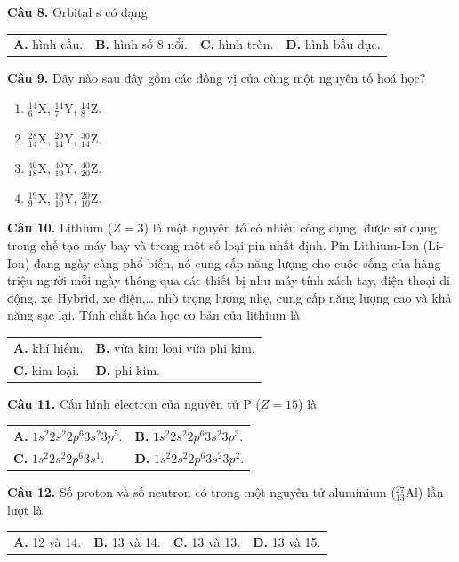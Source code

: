 \documentclass[11pt,a4paper]{article}
\begin{document}
\textbf{Câu 8.} Orbital s có dạng
\begin{tabularx}{\textwidth}{@{}XXXX@{}}
\textbf{A.} hình cầu. & \textbf{B.} hình số 8 nổi. & \textbf{C.} hình tròn. & \textbf{D.} hình bầu dục. \\
\end{tabularx}


\textbf{Câu 9.} Dãy nào sau đây gồm các đồng vị của cùng một nguyên tố hoá học?
\begin{enumerate}[label=\textbf{\Alph*.},leftmargin=*,itemsep=1pt,topsep=1pt]
\item $^{14}_6\text{X}$, $^{14}_7\text{Y}$, $^{14}_8\text{Z}$.
\item $^{28}_{14}\text{X}$, $^{29}_{14}\text{Y}$, $^{30}_{14}\text{Z}$.
\item $^{40}_{18}\text{X}$, $^{40}_{19}\text{Y}$, $^{40}_{20}\text{Z}$.
\item $^{19}_9\text{X}$, $^{19}_{10}\text{Y}$, $^{20}_{10}\text{Z}$.
\end{enumerate}


\textbf{Câu 10.} Lithium ($Z = 3$) là một nguyên tố có nhiều công dụng, được sử dụng trong chế tạo máy bay và trong một số loại pin nhất định. Pin Lithium-Ion (Li-Ion) đang ngày càng phổ biến, nó cung cấp năng lượng cho cuộc sống của hàng triệu người mỗi ngày thông qua các thiết bị như máy tính xách tay, điện thoại di động, xe Hybrid, xe điện,… nhờ trọng lượng nhẹ, cung cấp năng lượng cao và khả năng sạc lại. Tính chất hóa học cơ bản của lithium là
\begin{tabularx}{\textwidth}{@{}XX@{}}
\textbf{A.} khí hiếm. & \textbf{B.} vừa kim loại vừa phi kim. \\
\textbf{C.} kim loại. & \textbf{D.} phi kim. \\
\end{tabularx}


\textbf{Câu 11.} Cấu hình electron của nguyên tử P ($Z = 15$) là
\begin{tabularx}{\textwidth}{@{}XX@{}}
\textbf{A.} $1s^2 2s^2 2p^6 3s^2 3p^5$. & \textbf{B.} $1s^2 2s^2 2p^6 3s^2 3p^3$. \\
\textbf{C.} $1s^2 2s^2 2p^6 3s^1$. & \textbf{D.} $1s^2 2s^2 2p^6 3s^2 3p^2$. \\
\end{tabularx}


\textbf{Câu 12.} Số proton và số neutron có trong một nguyên tử aluminium ($^{27}_{13}\text{Al}$) lần lượt là
\begin{tabularx}{\textwidth}{@{}XXXX@{}}
\textbf{A.} 12 và 14. & \textbf{B.} 13 và 14. & \textbf{C.} 13 và 13. & \textbf{D.} 13 và 15. \\
\end{tabularx}
\end{document}
